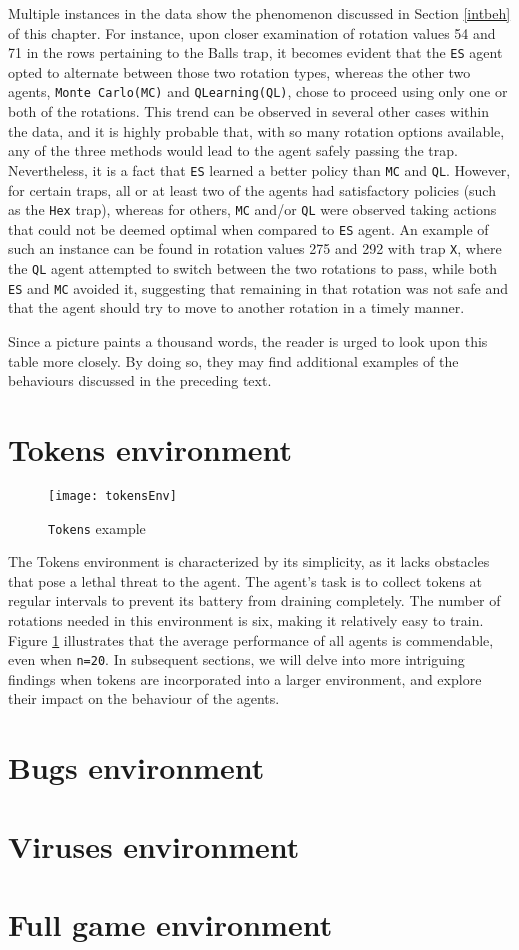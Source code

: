 Multiple instances in the data show the phenomenon discussed in Section \ref{intbeh} of this chapter. For instance, upon closer examination of rotation values 54 and 71 in the rows pertaining to the Balls trap, it becomes evident that the \texttt{ES} agent opted to alternate between those two rotation types, whereas the other two agents, \texttt{Monte Carlo(MC)} and \texttt{QLearning(QL)}, chose to proceed using only one or both of the rotations. This trend can be observed in several other cases within the data, and it is highly probable that, with so many rotation options available, any of the three methods would lead to the agent safely passing the trap. Nevertheless, it is a fact that \texttt{ES} learned a better policy than \texttt{MC} and \texttt{QL}. However, for certain traps, all or at least two of the agents had satisfactory policies (such as the \texttt{Hex} trap), whereas for others, \texttt{MC} and/or \texttt{QL} were observed taking actions that could not be deemed optimal when compared to \texttt{ES} agent. An example of such an instance can be found in rotation values 275 and 292 with trap \texttt{X}, where the \texttt{QL} agent attempted to switch between the two rotations to pass, while both \texttt{ES} and \texttt{MC} avoided it, suggesting that remaining in that rotation was not safe and that the agent should try to move to another rotation in a timely manner.

Since a picture paints a thousand words, the reader is urged to look upon this table more closely. By doing so, they may find additional examples of the behaviours discussed in the preceding text. 

\section{Tokens environment}
\begin{figure}[h]
    \centering
    \texttt{[image: tokensEnv]}
    \caption{\texttt{Tokens} example}
    \label{fig:tokens}
\end{figure}

The Tokens environment is characterized by its simplicity, as it lacks obstacles that pose a lethal threat to the agent. The agent's task is to collect tokens at regular intervals to prevent its battery from draining completely. The number of rotations needed in this environment is six, making it relatively easy to train. Figure \ref{fig:tokens} illustrates that the average performance of all agents is commendable, even when \texttt{n=20}. In subsequent sections, we will delve into more intriguing findings when tokens are incorporated into a larger environment, and explore their impact on the behaviour of the agents.

\section{Bugs environment}
\section{Viruses environment}
\section{Full game environment}